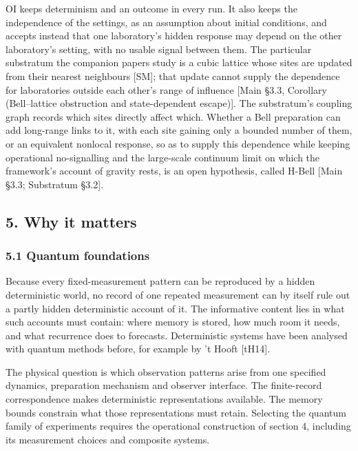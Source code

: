 \documentclass[
]{article}
\begin{document}
OI keeps determinism and an outcome in every run. It also keeps the
independence of the settings, as an assumption about initial conditions,
and accepts instead that one laboratory's hidden response may depend on
the other laboratory's setting, with no usable signal between them. The
particular substratum the companion papers study is a cubic lattice
whose sites are updated from their nearest neighbours {[}SM{]}; that
update cannot supply the dependence for laboratories outside each
other's range of influence {[}Main §3.3, Corollary (Bell--lattice
obstruction and state-dependent escape){]}. The substratum's coupling
graph records which sites directly affect which. Whether a Bell
preparation can add long-range links to it, with each site gaining only
a bounded number of them, or an equivalent nonlocal response, so as to
supply this dependence while keeping operational no-signalling and the
large-scale continuum limit on which the framework's account of gravity
rests, is an open hypothesis, called H-Bell {[}Main §3.3; Substratum
§3.2{]}.

\hypertarget{why-it-matters}{%
\subsection{5. Why it matters}\label{why-it-matters}}

\hypertarget{quantum-foundations}{%
\subsubsection{5.1 Quantum foundations}\label{quantum-foundations}}

Because every fixed-measurement pattern can be reproduced by a hidden
deterministic world, no record of one repeated measurement can by itself
rule out a partly hidden deterministic account of it. The informative
content lies in what such accounts must contain: where memory is stored,
how much room it needs, and what recurrence does to forecasts.
Deterministic systems have been analysed with quantum methods before,
for example by 't Hooft {[}tH14{]}.

The physical question is which observation patterns arise from one
specified dynamics, preparation mechanism and observer interface. The
finite-record correspondence makes deterministic representations
available. The memory bounds constrain what those representations must
retain. Selecting the quantum family of experiments requires the
operational construction of section 4, including its measurement choices
and composite systems.
\end{document}
